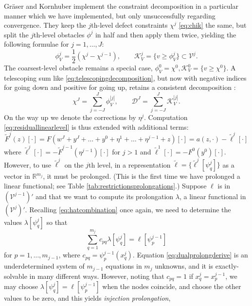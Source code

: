 \documentclass[letterpaper,final,12pt,reqno]{amsart}
\theoremstyle{claim}
\newcommand{\RR}{\mathbb{R}}
\numberwithin{equation}{section}
\numberwithin{figure}{section}
\numberwithin{table}{section}
\numberwithin{theorem}{section}
\begin{document}
Gr\"aser and Kornhuber \cite{GraeserKornhuber2009} implement the constraint decomposition in a particular manner which we have implemented, but only unsuccessfully regarding convergence.  They keep the $j$th-level defect constraints $\chi^j$ \eqref{eq:chik} the same, but split the $j$th-level obstacles $\phi^j$ in half and then apply them twice, yielding the following formulae for $j=1,\dots,J$:
\begin{equation}
\phi_V^j = \frac{1}{2}(\chi^j-\chi^{j-1}), \qquad \mathcal{K}_V^j = \{v \ge \phi_V^j\} \subset \mathcal{V}^j.
\end{equation}
The coarsest-level obstacle remains a special case, $\phi_V^0 = \chi^0,\mathcal{K}_V^0 = \{v \ge \chi^0\}$.  A telescoping sum like \eqref{eq:telescopingdecomposition}, but now with negative indices for going down and positive for going up, retains a consistent decomposition \cite{GraeserKornhuber2009,Tai2003}:
\begin{equation}
\chi^J = \sum_{j=-J}^J \phi_V^{|j|}, \qquad \mathcal{D}^J = \sum_{j=-J}^J \mathcal{K}_V^{|j|}.
\end{equation}
On the way up we denote the corrections by $\eta^j$.  Computation \eqref{eq:residuallinearlevel} is thus extended with additional terms:
\begin{equation}
  \tilde F^j(z)[\cdot] = F(w^J + y^J + \dots + y^0 + \eta^1 + \dots + \eta^{j-1} + z)[\cdot] = a(z,\cdot) - \tilde \ell^j[\cdot] \label{eq:residuallinearlevelv}
\end{equation}
where $\tilde\ell^j[\cdot] = - \tilde F^{j-1}(\eta^{j-1})[\cdot]$ for $j>1$ and $\tilde\ell^1[\cdot] = - F^0(y^0)[\cdot]$.  However, to use $\tilde\ell^j$ on the $j$th level, in a representation $\tilde{\bm{\ell}} = \{\tilde\ell^j[\psi_q^j]\}$ as a vector in $\RR^{m_j}$, it must be prolonged.  (This is the first time we have prolonged a linear functional; see Table \ref{tab:restrictionsprolongations}.)  Suppose $\ell$ is in $(\mathcal{V}^{j-1})'$ and that we want to compute its prolongation $\lambda$, a linear functional in $(\mathcal{V}^j)'$.  Recalling \eqref{eq:hatcombination} once again, we need to determine the values $\lambda[\psi_q^j]$ so that
\begin{equation}
  \sum_{q=1}^{m_j} c_{pq} \lambda[\psi_q^j] = \ell[\psi_p^{j-1}] \label{eq:dualprolongderive}
\end{equation}
for $p=1,\dots,m_{j-1}$, where $c_{pq} = \psi_p^{j-1}(x_q^j)$.  Equation \eqref{eq:dualprolongderive} is an underdetermined system of $m_{j-1}$ equations in $m_j$ unknowns, and it is exactly-solvable in many different ways.  However, noting that $c_{pq}=1$ if $x_q^j=x_p^{j-1}$, we may choose $\lambda[\psi_q^j] = \ell[\psi_p^{j-1}]$ when the nodes coincide, and choose the other values to be zero, and this yields \emph{injection prolongation},
\end{document}
